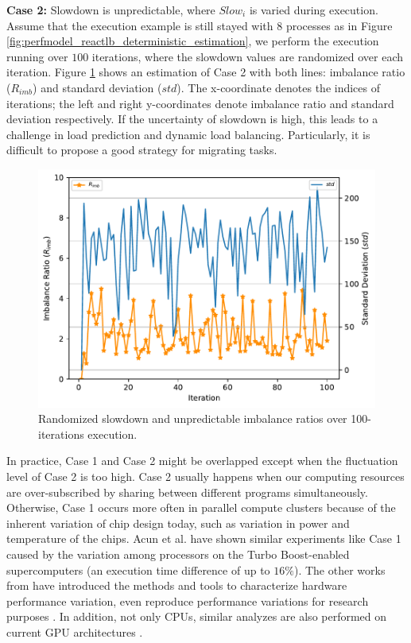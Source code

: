 \noindent \textbf{Case 2:} Slowdown is unpredictable, where $Slow_{i}$ is varied during execution. Assume that the execution example is still stayed with $8$ processes as in Figure \ref{fig:perfmodel_reactlb_deterministic_estimation}, we perform the execution running over $100$ iterations, where the slowdown values are randomized over each iteration. Figure \ref{fig:randomized_slowdown} shows an estimation of Case 2 with both lines: imbalance ratio ($R_{imb}$) and standard deviation ($std$). The x-coordinate denotes the indices of iterations; the left and right y-coordinates denote imbalance ratio and standard deviation respectively. If the uncertainty of slowdown is high, this leads to a challenge in load prediction and dynamic load balancing. Particularly, it is difficult to propose a good strategy for migrating tasks.\\

\begin{figure}[t]
  \centering
  \includegraphics[scale=0.45]{./pictures/perf_analysis_model/perf_double_line_random_slowdown.pdf}
	\caption{Randomized slowdown and unpredictable imbalance ratios over 100-iterations execution.}
	\label{fig:randomized_slowdown}
\end{figure}

In practice, Case 1 and Case 2 might be overlapped except when the fluctuation level of Case 2 is too high. Case 2 usually happens when our computing resources are over-subscribed by sharing between different programs simultaneously. Otherwise, Case 1 occurs more often in parallel compute clusters because of the inherent variation of chip design today, such as variation in power and temperature of the chips. Acun et al. \cite{acun2016variturboboost} have shown similar experiments like Case 1 caused by the variation among processors on the Turbo Boost-enabled supercomputers (an execution time difference of up to $16\%$). The other works from \cite{weisbach2018hwvariation} \cite{tuncer2019onlinediagvar} have introduced the methods and tools to characterize hardware performance variation, even reproduce performance variations for research purposes \cite{ates2019hpas}. In addition, not only CPUs, similar analyzes are also performed on current GPU architectures \cite{yoshida2022perfvargpu}.\\

